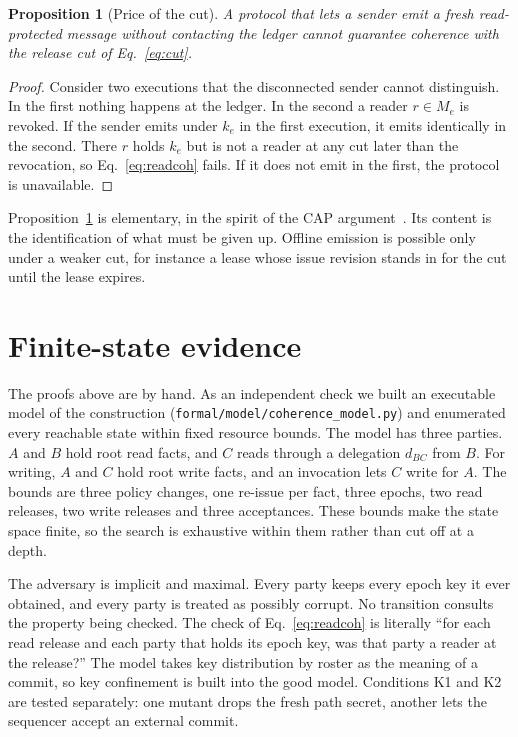 \documentclass[aps,prx,reprint,superscriptaddress,nofootinbib,floatfix]{revtex4-2}
\newtheorem{proposition}{Proposition}
\theoremstyle{remark}
\newcommand{\roster}{M}
\begin{document}
\begin{proposition}[Price of the cut]\label{prop:price}
A protocol that lets a sender emit a fresh read-protected message without contacting the ledger cannot guarantee coherence with the release cut of Eq.~\eqref{eq:cut}.
\end{proposition}
\begin{proof}
Consider two executions that the disconnected sender cannot distinguish. In the first nothing happens at the ledger. In the second a reader $r\in\roster_e$ is revoked. If the sender emits under $k_e$ in the first execution, it emits identically in the second. There $r$ holds $k_e$ but is not a reader at any cut later than the revocation, so Eq.~\eqref{eq:readcoh} fails. If it does not emit in the first, the protocol is unavailable.
\end{proof}
Proposition~\ref{prop:price} is elementary, in the spirit of the CAP argument~\cite{gilbert-lynch}. Its content is the identification of what must be given up. Offline emission is possible only under a weaker cut, for instance a lease whose issue revision stands in for the cut until the lease expires.

\section{Finite-state evidence}\label{sec:evidence}

The proofs above are by hand. As an independent check we built an executable model of the construction (\texttt{formal/model/coherence\_model.py}) and enumerated every reachable state within fixed resource bounds. The model has three parties. $A$ and $B$ hold root read facts, and $C$ reads through a delegation $d_{BC}$ from $B$. For writing, $A$ and $C$ hold root write facts, and an invocation lets $C$ write for $A$. The bounds are three policy changes, one re-issue per fact, three epochs, two read releases, two write releases and three acceptances. These bounds make the state space finite, so the search is exhaustive within them rather than cut off at a depth.

The adversary is implicit and maximal. Every party keeps every epoch key it ever obtained, and every party is treated as possibly corrupt. No transition consults the property being checked. The check of Eq.~\eqref{eq:readcoh} is literally ``for each read release and each party that holds its epoch key, was that party a reader at the release?'' The model takes key distribution by roster as the meaning of a commit, so key confinement is built into the good model. Conditions K1 and K2 are tested separately: one mutant drops the fresh path secret, another lets the sequencer accept an external commit.
\end{document}
